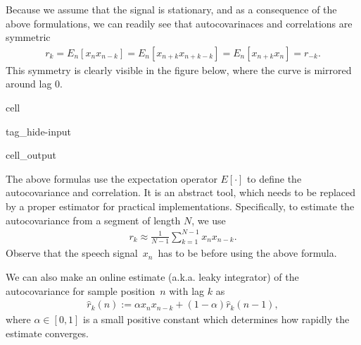 \documentclass[letterpaper,10pt,english]{jupyterBook}
\begin{document}
\sphinxAtStartPar
Because we assume that the signal is stationary, and as a consequence of
the above formulations, we can readily see that autocovarinaces and
\sphinxhyphen{}correlations are symmetric
\begin{equation*}
\begin{split} r_k = E_n[x_nx_{n-k}] = E_n[x_{n+k}x_{n+k-k}] =
E_n[x_{n+k}x_{n}] = r_{-k}. \end{split}
\end{equation*}
\sphinxAtStartPar
This symmetry is clearly visible in the figure below, where the
curve is mirrored around lag 0.

\begin{sphinxuseclass}{cell}
\begin{sphinxuseclass}{tag_hide-input}\begin{sphinxVerbatimOutput}

\begin{sphinxuseclass}{cell_output}
\noindent{}

\end{sphinxuseclass}\end{sphinxVerbatimOutput}

\end{sphinxuseclass}
\end{sphinxuseclass}
\sphinxAtStartPar
The above formulas use the expectation operator \(E[\cdot ]\) to define the
autocovariance and \sphinxhyphen{}correlation. It is an abstract tool, which needs to
be replaced by a proper estimator for practical implementations.
Specifically, to estimate the autocovariance from a segment of length
\(N\), we use
\begin{equation*}
\begin{split} r_k \approx \frac1{N-1} \sum_{k=1}^{N-1} x_n x_{n-k}. \end{split}
\end{equation*}
\sphinxAtStartPar
Observe that the speech signal \(x_{n}\) has to be
{\hyperref[\detokenize{Representations/Windowing::doc}]{}} before using the above formula.

\sphinxAtStartPar
We can also make an on\sphinxhyphen{}line estimate (a.k.a. leaky integrator) of the autocovariance for sample
position \(n\) with lag \(k\) as
\begin{equation*}
\begin{split} \hat r_k(n) := \alpha x_n x_{n-k} + (1-\alpha) \hat r_k(n-1),
\end{split}
\end{equation*}
\sphinxAtStartPar
where \(\alpha\in[0,1]\) is a small positive constant which determines how rapidly the
estimate converges.
\end{document}
